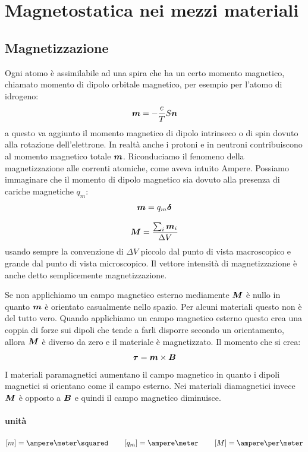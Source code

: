 \chapter{Magnetostatica nei mezzi materiali}
\minitoc
\section{Magnetizzazione}
Ogni atomo è assimilabile ad una spira che ha un certo momento magnetico, chiamato momento di dipolo orbitale magnetico, per esempio per l'atomo di idrogeno:
\begin{equation*}
\boldsymbol{m}=-\frac{e}{T}S\boldsymbol{n}
\end{equation*}
a questo va aggiunto il momento magnetico di dipolo intrinseco o di spin dovuto alla rotazione dell'elettrone. In realtà anche i protoni e in neutroni contribuiscono al momento magnetico totale $\boldsymbol{m}$. Riconduciamo il fenomeno della magnetizzazione alle correnti atomiche, come aveva intuito Ampere. Possiamo immaginare che il momento di dipolo magnetico sia dovuto alla presenza di cariche magnetiche $q_m$:
\begin{equation}
\boldsymbol{m}=q_m\boldsymbol{\delta}
\end{equation}
\begin{Def}
\begin{equation}
\boldsymbol{M}=\frac{\sum_i\boldsymbol{m}_i}{\Delta V}
\label{intensita_magnetizzazione}
\end{equation}
usando sempre la convenzione di $\Delta V$ piccolo dal punto di vista macroscopico e grande dal punto di vista microscopico. Il vettore intensità di magnetizzazione è anche detto semplicemente magnetizzazione.
\end{Def}
Se non applichiamo un campo magnetico esterno mediamente $\boldsymbol{M}$ è nullo in quanto $\boldsymbol{m}$ è orientato casualmente nello spazio. Per alcuni materiali questo non è del tutto vero. Quando applichiamo un campo magnetico esterno questo crea una coppia di forze sui dipoli che tende a farli disporre secondo un orientamento, allora $\boldsymbol{M}$ è diverso da zero e il materiale è magnetizzato. Il momento che si crea:
\begin{equation*}
\boldsymbol{\tau}=\boldsymbol{m}\times\boldsymbol{B}
\end{equation*}
I materiali paramagnetici aumentano il campo magnetico in quanto i dipoli magnetici si orientano come il campo esterno. Nei materiali diamagnetici invece $\boldsymbol{M}$ è opposto a $\boldsymbol{B}$ e quindi il campo magnetico diminuisce.
\subsubsection{unità}
\begin{equation*}
\left[m\right]=\ampere\meter\squared
\qquad
\left[q_m\right]=\ampere\meter
\qquad
\left[M\right]=\ampere\per\meter
\end{equation*}
